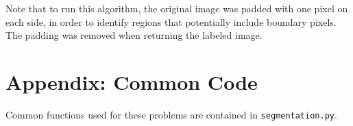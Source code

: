 \documentclass[aps,letterpaper,10pt]{article}
\begin{document}
Note that to run this algorithm, the original image was padded with one pixel on each side, in order to identify regions that potentially include boundary pixels.  The padding was removed when returning the labeled image.




\section{Appendix: Common Code}
Common functions used for these problems are contained in \texttt{segmentation.py}.

\end{document}
